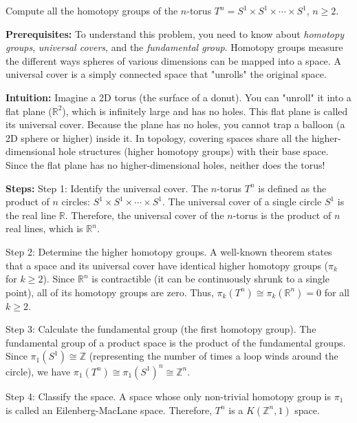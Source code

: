 \begin{exercise}
\label{geometry:2021:3}
Compute all the homotopy groups of the $n$-torus $T^{n} = S^{1} \times S^{1} \times \cdots \times S^{1}$, $n \geq 2$.
\end{exercise}

\begin{solution}
\textbf{Prerequisites:}
To understand this problem, you need to know about \textit{homotopy groups}, \textit{universal covers}, and the \textit{fundamental group}. Homotopy groups measure the different ways spheres of various dimensions can be mapped into a space. A universal cover is a simply connected space that "unrolls" the original space.

\vspace{\baselineskip}
\textbf{Intuition:}
Imagine a 2D torus (the surface of a donut). You can "unroll" it into a flat plane ($\mathbb{R}^2$), which is infinitely large and has no holes. This flat plane is called its universal cover. Because the plane has no holes, you cannot trap a balloon (a 2D sphere or higher) inside it. In topology, covering spaces share all the higher-dimensional hole structures (higher homotopy groups) with their base space. Since the flat plane has no higher-dimensional holes, neither does the torus!

\vspace{\baselineskip}
\textbf{Steps:}
Step 1: Identify the universal cover. The $n$-torus $T^n$ is defined as the product of $n$ circles: $S^1 \times S^1 \times \cdots \times S^1$. The universal cover of a single circle $S^1$ is the real line $\mathbb{R}$. Therefore, the universal cover of the $n$-torus is the product of $n$ real lines, which is $\mathbb{R}^n$.

Step 2: Determine the higher homotopy groups. A well-known theorem states that a space and its universal cover have identical higher homotopy groups ($\pi_k$ for $k \geq 2$). Since $\mathbb{R}^n$ is contractible (it can be continuously shrunk to a single point), all of its homotopy groups are zero. Thus, $\pi_k(T^n) \cong \pi_k(\mathbb{R}^n) = 0$ for all $k \geq 2$.

Step 3: Calculate the fundamental group (the first homotopy group). The fundamental group of a product space is the product of the fundamental groups. Since $\pi_1(S^1) \cong \mathbb{Z}$ (representing the number of times a loop winds around the circle), we have $\pi_1(T^n) \cong \pi_1(S^1)^n \cong \mathbb{Z}^n$.

Step 4: Classify the space. A space whose only non-trivial homotopy group is $\pi_1$ is called an Eilenberg-MacLane space. Therefore, $T^n$ is a $K(\mathbb{Z}^n, 1)$ space.
\end{solution}

